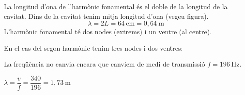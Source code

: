 \begin{solapartat}

 La longitud d'ona de l'harmònic fonamental és el doble de la longitud de la cavitat. Dins de la cavitat tenim mitja longitud d'ona (vegeu figura).
\[ \lambda = 2L = 64\ \mathrm{cm} = 0,64\ \mathrm{m} \]
L'harmònic fonamental té dos nodes (extrems) i un ventre (al centre).

 En el cas del segon harmònic tenim tres nodes i dos ventres:

\end{solapartat}

\begin{solapartat}
 La freqüència no canvia encara que canviem de medi de transmissió $f = 196\ \mathrm{Hz}$.

 $\lambda = \dfrac{v}{f} = \dfrac{340}{196} = 1,73\ \mathrm{m}$
\end{solapartat}
